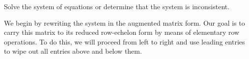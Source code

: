 \documentclass{ximera}
\begin{document}
\begin{example}\label{ex:freevar1} Solve the system of equations or determine that the system is inconsistent.
\begin{explanation}
We begin by rewriting the system in the augmented matrix form.
 Our goal is to carry this matrix to its reduced row-echelon form by means of elementary row operations.  To do this, we will proceed from left to right and use leading entries to wipe out all entries above and below them.
 
 
 

\end{explanation}
\end{example}
\end{document}
